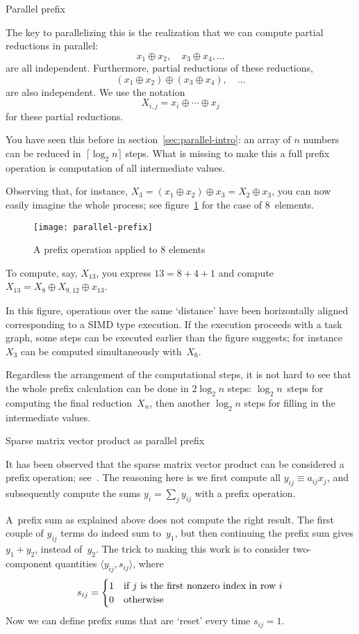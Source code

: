  {Parallel prefix}

The key to parallelizing this is the realization that we can compute 
partial reductions in parallel:
\[ x_1\oplus x_2, \quad x_3\oplus x_4, \ldots \]
are all independent.
Furthermore, partial reductions of these reductions,
\[ (x_1\oplus x_2) \oplus (x_3\oplus x_4),\quad \ldots \]
are also independent. We use the notation 
\[ X_{i,j}=x_i\oplus\cdots\oplus x_j \]
for these partial reductions.

You have seen this before in section~\ref{sec:parallel-intro}:
an array of $n$ numbers can be reduced in~$\lceil \log_2 n\rceil$ 
steps.
What is missing to make this a full prefix operation
is computation of all intermediate values. 

Observing that, for instance, $X_3=(x_1\oplus x_2)\oplus x_3=X_2\oplus x_3$,
you can now easily imagine the whole process; see figure~\ref{fig:prefix}
for the case of $8$~elements.
\begin{figure}[ht]
  \texttt{[image: parallel-prefix]}
  \caption{A prefix operation applied to 8 elements}
  \label{fig:prefix}
\end{figure}
To compute, say, $X_{13}$, you express $13=8+4+1$ and compute
$X_{13}=X_8\oplus X_{9,12} \oplus x_13$.

In this figure, operations over the same `distance' have been
horizontally aligned corresponding to a \ac{SIMD} type execution.
If the execution proceeds with a task graph, some steps can be
executed earlier than the figure suggests; for instance $X_3$ can be
computed simultaneously with~$X_6$.

Regardless the arrangement of the computational steps,
it is not hard to see that the whole prefix calculation
can be done in $2\log_2n$ steps: $\log_2 n$~steps for 
computing the final reduction~$X_n$, then another $\log_2 n$
steps for filling in the intermediate values.

 {Sparse matrix vector product as parallel prefix}
\label{sec:spmvp-prefix}

It has been observed that the sparse matrix vector product can be considered a prefix operation; 
see~\cite{Blelloc:segmented-report}.
The reasoning here is we first compute all $y_{ij}\equiv a_{ij}x_j$, and subsequently
compute the sums $y_i=\sum_j y_{ij}$ with a prefix operation.

A~prefix sum as explained above does not compute the right result. The first couple of $y_{ij}$ terms
do indeed sum to~$y_1$, but then continuing the prefix sum gives $y_1+y_2$, instead of~$y_2$.
The trick to making this work is to consider two-component quantities $\langle y_{ij},s_{ij}\rangle$,
where
\[ s_{ij} =
\begin{cases}
1&\hbox{if $j$ is the first nonzero index in row $i$}\\ 0&\hbox{otherwise}
\end{cases}
\]
Now we can define prefix sums that are `reset' every time $s_{ij}=1$.

